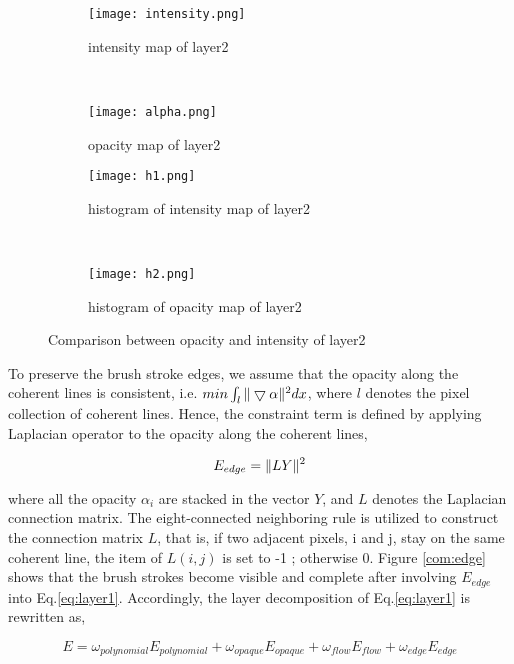 \begin{figure}[H]
 		\centering
	\begin{subfigure}[b]{0.4\textwidth}
		\centering
		\texttt{[image: intensity.png]}
		\caption{intensity map of layer2}
	\end{subfigure}
	~
	\begin{subfigure}[b]{0.4\textwidth}
		\centering
		\texttt{[image: alpha.png]}
		\caption{opacity map of layer2}
	\end{subfigure}
 

 
	\centering
	\begin{subfigure}[b]{0.4\textwidth}
		\texttt{[image: h1.png]}
		\caption{histogram of intensity map of layer2}
	\end{subfigure}
	~  	
	\begin{subfigure}[b]{0.4\textwidth}
		\texttt{[image: h2.png]}
		\caption{histogram of opacity map of layer2}
	\end{subfigure}
	\caption{Comparison between opacity and intensity of layer2}
	\label{histo}
\end{figure}
 
To preserve the brush stroke edges, we assume that the opacity along the coherent lines is consistent, i.e. $min \int_{l}\Arrowvert \bigtriangledown\alpha \Arrowvert^2 dx $, where $l$ denotes the pixel collection of coherent lines. Hence, the constraint term is defined by applying Laplacian operator to the opacity along the coherent lines,

\begin{equation} 
E_{edge}=\Arrowvert LY \Arrowvert^2 
\end{equation} 

where all the opacity $\alpha_i$ are stacked in the vector $Y$, and $L$ denotes the Laplacian connection matrix. The eight-connected neighboring rule is utilized to construct the connection matrix $L$, that is, if two adjacent pixels, i and j, stay on the same coherent line, the item of $L(i,j)$ is set to -1 ; otherwise 0. Figure \ref{com:edge} shows that the brush strokes become visible and complete after involving $E_{edge}$ into Eq.\ref{eq:layer1}.
Accordingly, the layer decomposition of Eq.\ref{eq:layer1} is rewritten as,

\begin{equation}
E=\omega_{polynomial}E_{polynomial}+\omega_{opaque}E_{opaque}+\omega_{flow}E_{flow}+\omega_{edge}E_{edge}
\label{eq:layer_sum}
\end{equation} 


